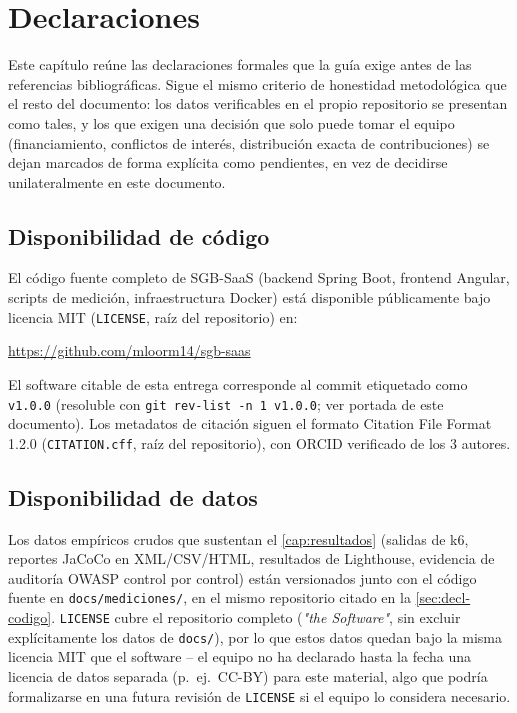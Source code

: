 \chapter{Declaraciones}

Este capítulo reúne las declaraciones formales que la guía exige antes de
las referencias bibliográficas. Sigue el mismo criterio de honestidad
metodológica que el resto del documento: los datos verificables en el
propio repositorio se presentan como tales, y los que exigen una
decisión que solo puede tomar el equipo (financiamiento, conflictos de
interés, distribución exacta de contribuciones) se dejan marcados de
forma explícita como pendientes, en vez de decidirse unilateralmente en
este documento.

\section{Disponibilidad de código}
\label{sec:decl-codigo}

El código fuente completo de SGB-SaaS (backend Spring Boot, frontend
Angular, scripts de medición, infraestructura Docker) está disponible
públicamente bajo licencia MIT (\texttt{LICENSE}, raíz del repositorio)
en:

\begin{center}
\url{https://github.com/mloorm14/sgb-saas}
\end{center}

El software citable de esta entrega corresponde al commit etiquetado
como \texttt{v1.0.0} (resoluble con \texttt{git rev-list -n 1 v1.0.0};
ver portada de este documento). Los metadatos de citación siguen el
formato Citation File Format 1.2.0 (\texttt{CITATION.cff}, raíz del
repositorio), con ORCID verificado de los 3 autores.

\section{Disponibilidad de datos}

Los datos empíricos crudos que sustentan el \autoref{cap:resultados}
(salidas de k6, reportes JaCoCo en XML/CSV/HTML, resultados de
Lighthouse, evidencia de auditoría OWASP control por control) están
versionados junto con el código fuente en \texttt{docs/mediciones/}, en
el mismo repositorio citado en la
\autoref{sec:decl-codigo}. \texttt{LICENSE} cubre el repositorio
completo (\emph{"the Software"}, sin excluir explícitamente los datos de
\texttt{docs/}), por lo que estos datos quedan bajo la misma licencia
MIT que el software -- el equipo no ha declarado hasta la fecha una
licencia de datos separada (p.~ej.\ CC-BY) para este material, algo que
podría formalizarse en una futura revisión de \texttt{LICENSE} si el
equipo lo considera necesario.


